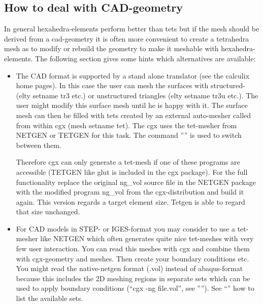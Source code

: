 \documentclass{article}
\begin{document}
\begin{appendix}
\subsection{\label{How to deal with CAD-geometry}How to deal with CAD-geometry}
In general hexahedra-elements perform better than tets but if the mesh should be derived from a cad-geometry it is often more convenient to create a tetrahedra mesh as to modify or rebuild the geometry to make it meshable with hexahedra-elements. The following section gives some hints which alternatives are available:

\begin{itemize}

\item The CAD format is supported by a stand alone translator (see the calculix home pages). In this case the user can mesh the surfaces with structured- \cite{Coons} (elty setname tr3 etc.) or unstructured triangles \cite{mesh2d} (elty setname tr3u etc.). The user might modify this surface mesh until he is happy with it. The surface mesh can then be filled with tets created by an external auto-mesher called from within cgx (mesh setname tet). The cgx uses the tet-mesher from NETGEN \cite{NETGEN} or TETGEN \cite{TETGEN} for this task. The command '''' is used to switch between them.

Therefore cgx can only generate a tet-mesh if one of these programs are accessible (TETGEN like glut is included in the cgx package). For the full functionality replace the original ng\_vol source file in the NETGEN package with the modified program ng\_vol from the cgx-distribution and build it again. This version regards a target element size. Tetgen is able to regard that size unchanged.

\item For CAD models in STEP- or IGES-format you may consider to use a tet-mesher like NETGEN \cite{NETGEN} which often generates quite nice tet-meshes with very few user interaction. You can read this meshes with cgx and combine them with cgx-geometry and meshes. Then create your boundary conditions etc. You might read the native-netgen format (.vol) instead of abaqus-format because this includes the 2D meshing regions in separate sets which can be used to apply boundary conditions (``cgx -ng file.vol'', see ''''). See ``'' how to list the available sets.


\end{itemize}
\end{appendix}
\end{document}
